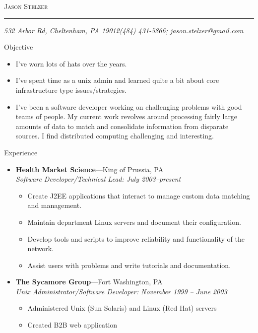 \documentclass[11pt,oneside]{article}
\makeatletter
\newcommand{\name}{Jason Stelzer}
\newcommand{\addr}{532 Arbor Rd, Cheltenham, PA 19012}
\newcommand{\phone}{(484) 431-5866}
\newcommand{\email}{jason.stelzer@gmail.com}
\newcommand{\bigname}[1]{
	\begin{center}\fontfamily{phv}\selectfont\Huge\scshape#1\end{center}
}
\newenvironment{ressection}[1]{
	\vspace{4pt}
	{\fontfamily{phv}\selectfont\Large#1}
	\begin{itemize}
	\vspace{3pt}
}{
	\end{itemize}
}
\newcommand{\resitem}[1]{
	\vspace{-4pt}
	\item \begin{flushleft} #1 \end{flushleft}
}
\newcommand{\ressubitem}[1]{
	\vspace{-1pt}
	\item \begin{flushleft} #1 \end{flushleft}
}
\newcommand{\resbigitem}[3]{
	\vspace{-5pt}
	\item
	\textbf{#1}---#2 \\
	\textit{#3}
}
\newenvironment{ressubsec}[3]{
	\resbigitem{#1}{#2}{#3}
	\vspace{-2pt}
	\begin{itemize}
}{
	\end{itemize}
}
\makeatother
\begin{document}
 \selectfont

\bigname{\name}

\vspace{-8pt} \rule{\textwidth}{1pt}

\vspace{-1pt} {\small\itshape \addr \hfill \phone; \email}

\vspace{8 pt}


\begin{ressection}{Objective}
	\resitem{I've worn lots of hats over the years.}

	
	\resitem{I've spent time as a unix admin and learned quite a bit about core infrastructure type issues/strategies.}

	\resitem{I've been a software developer working on challenging problems with good teams of people. My current work revolves around processing fairly large amounts of data to match and consolidate information from disparate sources. I find distributed computing challenging and interesting.}
	
\end{ressection}

\begin{ressection}{Experience}
	\begin{ressubsec}{Health Market Science}{King of Prussia, PA}{Software Developer/Technical Lead: July 2003--present}
		\ressubitem{Create J2EE applications that interact to manage custom data matching and management.}
		\ressubitem{Maintain department Linux servers and document their configuration.}
		\ressubitem{Develop tools and scripts to improve reliability and functionality of the network.}
		\ressubitem{Assist users with problems and write tutorials and documentation.}
	\end{ressubsec}
	\begin{ressubsec}{The Sycamore Group}{Fort Washington, PA}{Unix Administrator/Software Developer: November 1999 -- June 2003}
		\ressubitem{Administered Unix (Sun Solaris) and Linux (Red Hat) servers}
		\ressubitem{Created B2B web application}
        \end{ressubsec}
\end{ressection}
\end{document}

